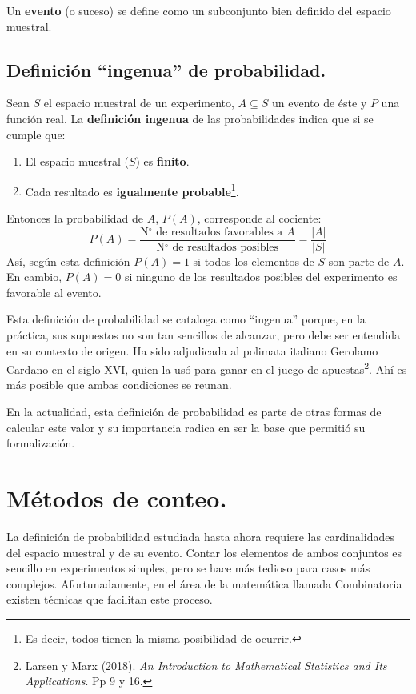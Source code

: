 \documentclass[12pt]{article}
\begin{document}
Un \textbf{evento} (o suceso) se define como un subconjunto bien definido del espacio muestral.

\subsection{Definición ``ingenua'' de probabilidad.}

Sean $S$ el espacio muestral de un experimento, $A \subseteq S$ un evento de éste y $P$ una función real. La \textbf{definición ingenua} de las probabilidades indica que si se cumple que:

\begin{enumerate}
\item El espacio muestral ($S$) es \textbf{finito}.
\item Cada resultado es \textbf{igualmente probable}\footnote{Es decir, todos tienen la misma posibilidad de ocurrir.}.
\end{enumerate}

Entonces la probabilidad de $A$, $P(A)$, corresponde al cociente:
\[
  P(A) = \frac{\text{N$^{\circ}$ de resultados favorables a } A}{\text{N$^{\circ}$ de resultados posibles}} = \frac{|A|}{|S|}
\]
Así, según esta definición $P(A) = 1$ si todos los elementos de $S$ son parte de $A$. En cambio, $P(A) = 0$ si ninguno de los resultados posibles del experimento es favorable al evento.

Esta definición de probabilidad se cataloga como ``ingenua'' porque, en la práctica, sus supuestos no son tan sencillos de alcanzar, pero debe ser entendida en su contexto de origen. Ha sido adjudicada al polimata italiano Gerolamo Cardano en el siglo XVI, quien la usó para ganar en el juego de apuestas\footnote{Larsen y Marx (2018). \textit{An Introduction to Mathematical Statistics and Its Applications}. Pp 9 y 16.}. Ahí es más posible que ambas condiciones se reunan.

En la actualidad, esta definición de probabilidad es parte de otras formas de calcular este valor y su importancia radica en ser la base que permitió su formalización.


\section{Métodos de conteo.}

La definición de probabilidad estudiada hasta ahora requiere las cardinalidades del espacio muestral y de su evento. Contar los elementos de ambos conjuntos es sencillo en experimentos simples, pero se hace más tedioso para casos más complejos. Afortunadamente, en el área de la matemática llamada Combinatoria existen técnicas que facilitan este proceso.
\end{document}
